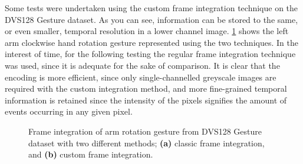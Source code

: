 Some tests were undertaken using the custom frame integration technique on the DVS128 Gesture dataset. As you can see, information can be stored to the same, or even smaller, temporal resolution in a lower channel image. \cref{fig:frame_integration_comparison} shows the left arm clockwise hand rotation gesture represented using the two techniques. In the interest of time, for the following testing the regular frame integration technique was used, since it is adequate for the sake of comparison. It is clear that the encoding is more efficient, since only single-channelled greyscale images are required with the custom integration method, and more fine-grained temporal information is retained since the intensity of the pixels signifies the amount of events occurring in any given pixel.

\begin{figure}[htb]%
    \centering
    \qquad
    \caption{Frame integration of arm rotation gesture from DVS128 Gesture dataset with two different methods; \textbf{(a)} classic frame integration, and \textbf{(b)} custom frame integration.}%
    \label{fig:frame_integration_comparison}%
\end{figure}

